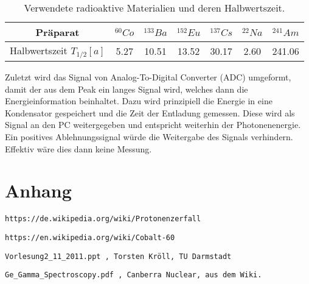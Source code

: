 \documentclass[]{article}
\begin{document}
\begin{table}[H]
\centering
\begin{tabular}{c|c|c|c|c|c|c}
Präparat & $^{60}Co$& $^{133}Ba$& $^{152}Eu$& $^{137}Cs$& $^{22}Na$ & $^{241}Am$ \\ \hline 
Halbwertszeit $T_{1/2} [a]$ & 5.27 & 10.51 & 13.52 & 30.17 & 2.60 & 241.06  \\ 
\end{tabular}
\caption{Verwendete radioaktive Materialien und deren Halbwertszeit.}
\label{tab:T 1/2}
\end{table}

Zuletzt wird das Signal von Analog-To-Digital Converter (ADC) umgeformt, damit der aus dem Peak ein langes Signal wird, welches dann die Energieinformation beinhaltet. Dazu wird prinzipiell die Energie in eine Kondensator gespeichert und die Zeit der Entladung gemessen. Diese wird als Signal an den PC weitergegeben und entspricht weiterhin der Photonenenergie. Ein positives Ablehnungssignal würde die Weitergabe des Signals verhindern. Effektiv wäre dies dann keine Messung.



\newpage
\section{Anhang}


\newpage
\begin{thebibliography}{}

 \begin{verbatim}
https://de.wikipedia.org/wiki/Protonenzerfall
\end{verbatim}

 \begin{verbatim}
https://en.wikipedia.org/wiki/Cobalt-60
\end{verbatim}

\begin{verbatim}
Vorlesung2_11_2011.ppt , Torsten Kröll, TU Darmstadt
\end{verbatim}  

\begin{verbatim}
Ge_Gamma_Spectroscopy.pdf , Canberra Nuclear, aus dem Wiki.
\end{verbatim}  

\end{thebibliography}
\end{document}
